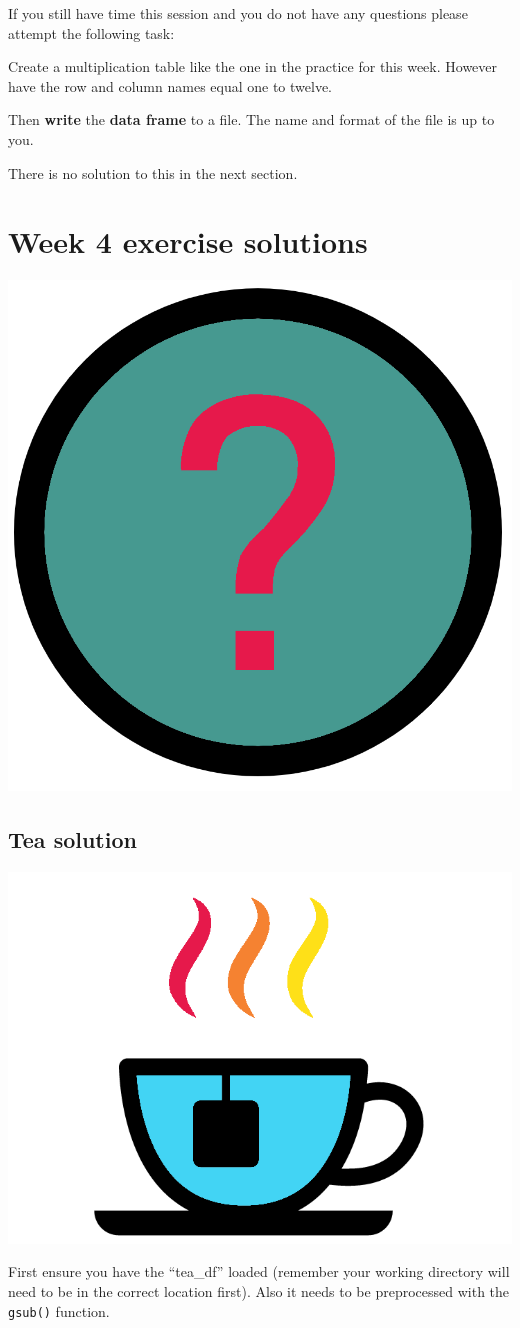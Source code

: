 \documentclass[]{book}
\begin{document}
If you still have time this session and you do not have any questions
please attempt the following task:

Create a multiplication table like the one in the practice for this
week. However have the row and column names equal one to twelve.

Then \textbf{write} the \textbf{data frame} to a file. The name and
format of the file is up to you.

There is no solution to this in the next section.

\chapter{Week 4 exercise solutions}\label{week-4-exercise-solutions}

\begin{center}\includegraphics[width=0.2\linewidth]{figures/answers} \end{center}

\section{Tea solution}\label{tea-solution}

\begin{center}\includegraphics[width=0.2\linewidth]{figures/tea} \end{center}

First ensure you have the ``tea\_df'' loaded (remember your working
directory will need to be in the correct location first). Also it needs
to be preprocessed with the \texttt{gsub()} function.
\end{document}
